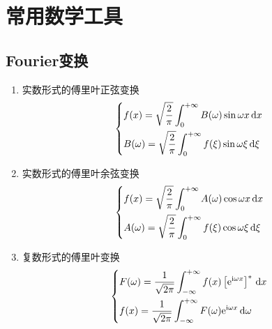 \section{常用数学工具}


\subsection{Fourier变换}
\begin{enumerate}
    \item 实数形式的傅里叶正弦变换
          \begin{equation}\label{实数形式的傅里叶正弦变换}
              \begin{dcases}
                  f(x)=\sqrt{\frac{2}{\pi}}\int_0^{+\infty}B(\omega)\sin{\omega x}\,\mathrm{d}x      \\
                  B(\omega)=\sqrt{\frac{2}{\pi}}\int_0^{+\infty}f(\xi)\sin{\omega\xi}\,\mathrm{d}\xi \\
              \end{dcases}
          \end{equation}
    \item 实数形式的傅里叶余弦变换
          \begin{equation}\label{实数形式的傅里叶余弦变换}
              \begin{dcases}
                  f(x)=\sqrt{\frac{2}{\pi}}\int_0^{+\infty}A(\omega)\cos{\omega x}\,\mathrm{d}x      \\
                  A(\omega)=\sqrt{\frac{2}{\pi}}\int_0^{+\infty}f(\xi)\cos{\omega\xi}\,\mathrm{d}\xi \\
              \end{dcases}
          \end{equation}
    \item 复数形式的傅里叶变换
          \begin{equation}\label{复数形式的傅里叶变换}
              \begin{dcases}
                  F(\omega)=\frac{1}{\sqrt{2\pi}}\int_{-\infty}^{+\infty}f(x)\left[\mathrm{e}^{\mathrm{i}\omega x}\right]^*\,\mathrm{d}x \\
                  f(x)=\frac{1}{\sqrt{2\pi}}\int_{-\infty}^{+\infty}F(\omega)\mathrm{e}^{\mathrm{i}\omega x}\,\mathrm{d}\omega           \\
              \end{dcases}
          \end{equation}
\end{enumerate}



